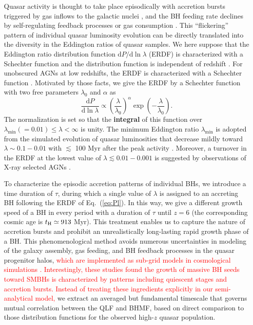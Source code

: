\documentclass[twocolumn, twocolappendix]{aastex63}
\newcommand{\tlife}{\tau}
\newcommand{\D}{\mathrm{d}}
\newcommand{\red}[1]{\textcolor{red}{ #1}}
\begin{document}
\begin{CJK*}{UTF8}{gbsn}
Quasar activity is thought to take place episodically with accretion bursts triggered by gas inflows to the galactic nuclei
\citep{2005Natur.433..604D,2005ApJ...630..705H}, 
and the BH feeding rate declines by self-regulating feedback processes \citep[e.g.,][]{2008ApJ...686..815Y,2011ApJ...737...26N} 
or gas consumption \citep{1991MNRAS.248..754P,2005ApJ...634..901Y,2007MNRAS.377L..25K}. 
This ``flickering'' pattern of individual quasar luminosity evolution can be directly translated into the diversity 
in the Eddington ratios of quasar samples. 
We here suppose that the Eddington ratio distribution function $\D P/ \D\ln\lambda$ (ERDF) is characterized
with a Schechter function and the distribution function is independent of redshift 
\citep{2006ApJ...639..700H,2009ApJ...698.1550H}.
For unobscured AGNs at low redshifts, the ERDF is characterized with a Schechter function
\citep{2015MNRAS.447.2085S,2016ApJ...826...12J,2018MNRAS.474.1225A}.
Motivated by those facts, we give the ERDF by a Schechter function with two free parameters $\lambda_0$ and $\alpha$ as
%
\begin{equation}
  \label{eq:Pl}
  \frac{\D P}{ \D \ln \lambda} \propto
  \left(\frac{\lambda} {\lambda_0} \right)^\alpha \exp{\left(-\frac{\lambda}{\lambda_0}\right)}.
\end{equation}
%
The normalization is set so that the \textbf{integral} of this function over $\lambda_\mathrm{min}(=0.01) \leq \lambda < \infty$ is unity.
The minimum Eddington ratio $\lambda_\mathrm{min}$ is adopted from the simulated evolution of quasar luminosities 
that decrease mildly toward $\lambda \sim 0.1-0.01$ with $\lesssim$ 100 Myr after the peak activity \citep{2011ApJ...737...26N}.
Moreover, a turnover in the ERDF at the lowest value of $\lambda\lesssim 0.01-0.001$ is suggested by observations of X-ray selected AGNs \citep{2018MNRAS.474.1225A}.  


To characterize the episodic accretion patterns of individual BHs, 
we introduce a time duration of $\tlife$, during which a single value of $\lambda$ is assigned to an accreting BH
following the ERDF of Eq.~(\ref{eq:Pl}).
In this way, we give a different growth speed of a BH in every period with a duration of $\tlife$ until $z=6$ 
(the corresponding cosmic age is $t_{\rm H}\simeq 913$ Myr).
This treatment enables us to capture the nature of accretion bursts and prohibit an unrealistically 
long-lasting rapid growth phase of a BH.
This phenomenological method avoids numerous uncertainties in modeling of the galaxy assembly, 
gas feeding, and BH feedback processes in the quasar progenitor halos,
\red{
which are implemented as sub-grid models in cosmological simulations \citep{2017MNRAS.467.4243D,2018MNRAS.473.4003B,2019MNRAS.488.4004L}.
Interestingly, these studies found the growth of massive BH seeds toward SMBHs is characterized by patterns including quiescent stages and accretion bursts.
Instead of treating these ingredients explicitly in our semi-analytical model,} we extract 
an averaged but fundamental timescale that governs mutual correlation between the QLF and BHMF,
based on direct comparison to those distribution functions for the observed high-$z$ quasar population.



\end{CJK*}
\end{document}
